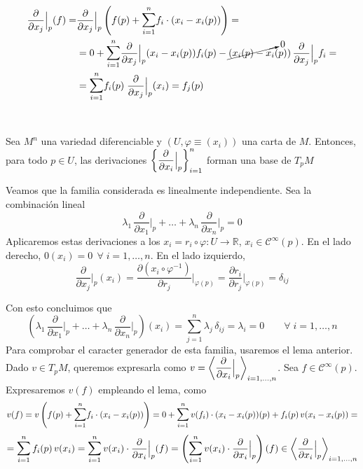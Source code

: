 \begin{dem}
\[ \begin{split}
    \frac{\partial}{\partial x_j}{\Big|_p} (f) = &  \frac{\partial}{\partial x_j}{\Big|_p} \left(f(p) + \mathlarger{\sum}_{i=1}^n f_i \cdot (x_i - x_i(p))\right) = \\ & = 0 + \mathlarger{\sum}_{i=1}^n \frac{\partial}{\partial x_j}{\Big|_p} (x_i -x_i(p)) f_i(p) -\cancelto{0}{(x_i(p)-x_i}(p)) \,\frac{\partial}{\partial x_j}{\Big|_p}f_i=\\ & = \mathlarger{\sum}_{i=1}^n f_i(p)\; \frac{\partial}{\partial x_j}{\Big|_p} (x_i) = f_j(p)
\end{split}\]
\end{dem}
\,
\begin{teo}
Sea $M^n$ una variedad diferenciable y $(U,\varphi\equiv(x_i))$ una carta de $M$. Entonces, para todo $p\in U$, las derivaciones $\left\{ \dfrac{\partial^{} }{\partial x_i}{\Big|_p}\right\}_{i=1}^n$ forman una base de $T_pM$
\end{teo}
\begin{dem}
Veamos que la familia considerada es linealmente independiente. Sea la combinación lineal $$\lambda_1\,{\frac{\partial}{\partial x_1}} {\Big|_p} + \dots + \lambda_n\,{\frac{\partial}{\partial x_n}} {\Big|_p} = 0$$
Aplicaremos estas derivaciones a los $x_i = r_i \circ \varphi : U \rightarrow \mathbb{R}$, $x_i \in \mathcal{C}^{\infty}(p)$. En el lado derecho, $0(x_i) = 0\;\, \forall \; i=1,\dots,n$. En el lado izquierdo, $$\displaystyle{\frac{\partial}{\partial x_j}} {\Big|_p} (x_i) = {\frac{\partial (x_i \circ \varphi^{-1})}{\partial r_j}} {\Big|_{\varphi(p)}} = {\frac{\partial r_i}{\partial r_j}} {\Big|_{\varphi(p)}} = \delta_{ij}$$

Con esto concluimos que  
$$\left(\lambda_1\,{\frac{\partial}{\partial x_1}} {\Big|_p} + \dots + \lambda_n\,{\frac{\partial}{\partial x_n}} {\Big|_p}\right) (x_i)= \sum_{j=1}^n \lambda_j \, \delta_{ij} = \lambda_i = 0 \qquad \forall\; i=1,\dots,n$$
Para comprobar el caracter generador de esta familia, usaremos el lema anterior. Dado $v \in T_pM$, queremos expresarla como $v = \left\langle{\dfrac{\partial^{} }{\partial x_i}} {\Big|_p}\right\rangle_{i=1,\dots,n}$. Sea $f \in \mathcal{C}^{\infty}(p)$. Expresaremos $v(f)$ empleando el lema, como $$v(f) = v\left(f(p) + \mathlarger{\sum}_{i=1}^n f_i \cdot (x_i - x_i(p))\right) = 0 + \mathlarger{\sum}_{i=1}^n \, v(f_i) \cdot (x_i - x_i(p))(p) + f_i(p)\, v(x_i - x_i(p)) =  $$ $$ = \mathlarger{\sum}_{i=1}^n \, f_i(p)\,v(x_i) =  \mathlarger{\sum}_{i=1}^n \, v(x_i) \cdot \frac{\partial}{\partial x_i} {\Big|_p}(f) = \left( \mathlarger{\sum}_{i=1}^n \, v(x_i) \cdot \frac{\partial}{\partial x_i} {\Big|_p}\right) (f) \in \left\langle{\pd{}{x_i}} {\Big|_p}\right\rangle_{i=1,\dots,n}$$
\end{dem}
